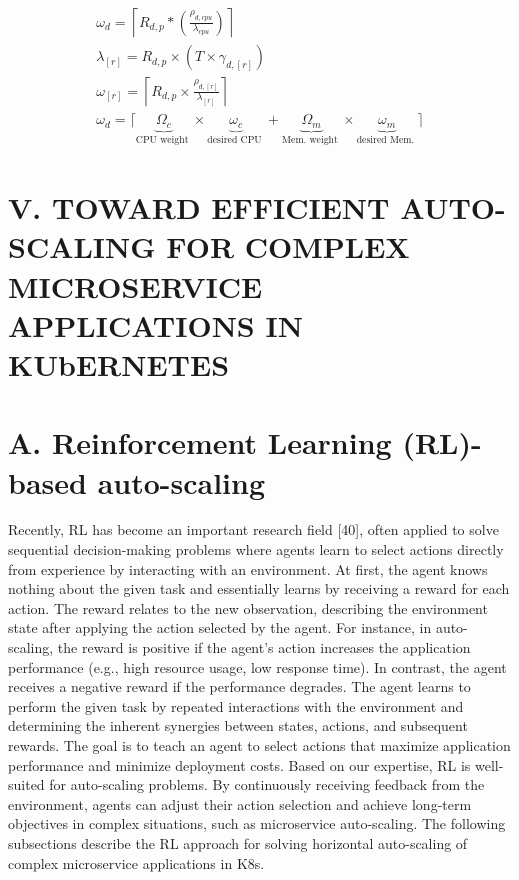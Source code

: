 \documentclass[10pt]{article}
\begin{document}
\begin{gather*}
\omega_{d}=\left\lceil R_{d, p} *\left(\frac{\rho_{d, c p u}}{\lambda_{c p u}}\right)\right\rceil  \tag{1}\\
\lambda_{[r]}=R_{d, p} \times\left(T \times \gamma_{d,[r]}\right)  \tag{2}\\
\omega_{[r]}=\left\lceil R_{d, p} \times \frac{\rho_{d,[r]}}{\lambda_{[r]}}\right\rceil  \tag{3}\\
\omega_{d}=\lceil\underbrace{\Omega_{c}}_{\text {CPU weight }} \times \underbrace{\omega_{c}}_{\text {desired CPU }}+\underbrace{\Omega_{m}}_{\text {Mem. weight }} \times \underbrace{\omega_{m}}_{\text {desired Mem. }}\rceil \tag{4}
\end{gather*}


\section*{V. TOWARD EFFICIENT AUTO-SCALING FOR COMPLEX MICROSERVICE APPLICATIONS IN KUbERNETES}
\section*{A. Reinforcement Learning (RL)-based auto-scaling}
Recently, RL has become an important research field [40], often applied to solve sequential decision-making problems where agents learn to select actions directly from experience by interacting with an environment. At first, the agent knows nothing about the given task and essentially learns by receiving a reward for each action. The reward relates to the new observation, describing the environment state after applying the action selected by the agent. For instance, in auto-scaling, the reward is positive if the agent's action increases the application performance (e.g., high resource usage, low response time). In contrast, the agent receives a negative reward if the performance degrades. The agent learns to perform the given task by repeated interactions with the environment and determining the inherent synergies between states, actions, and subsequent rewards. The goal is to teach an agent to select actions that maximize application performance and minimize deployment costs. Based on our expertise, RL is well-suited for auto-scaling problems. By continuously receiving feedback from the environment, agents can adjust their action selection and achieve long-term objectives in complex situations, such as microservice auto-scaling. The following subsections describe the RL approach for solving horizontal auto-scaling of complex microservice applications in K8s.
\end{document}
